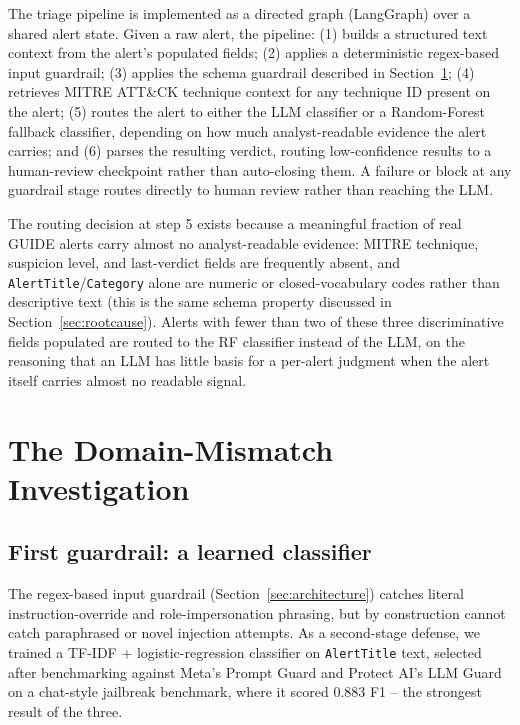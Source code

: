 \documentclass[conference]{IEEEtran}
\begin{document}
The triage pipeline is implemented as a directed graph (LangGraph) over a shared alert state.
Given a raw alert, the pipeline: (1) builds a structured text context from the alert's populated
fields; (2) applies a deterministic regex-based input guardrail; (3) applies the schema guardrail
described in Section~\ref{sec:guardrail}; (4) retrieves MITRE ATT\&CK technique context for any
technique ID present on the alert; (5) routes the alert to either the LLM classifier or a
Random-Forest fallback classifier, depending on how much analyst-readable evidence the alert
carries; and (6) parses the resulting verdict, routing low-confidence results to a human-review
checkpoint rather than auto-closing them. A failure or block at any guardrail stage routes
directly to human review rather than reaching the LLM.

The routing decision at step 5 exists because a meaningful fraction of real GUIDE alerts carry
almost no analyst-readable evidence: MITRE technique, suspicion level, and last-verdict fields
are frequently absent, and \texttt{AlertTitle}/\texttt{Category} alone are numeric or
closed-vocabulary codes rather than descriptive text (this is the same schema property discussed
in Section~\ref{sec:rootcause}). Alerts with fewer than two of these three discriminative fields
populated are routed to the RF classifier instead of the LLM, on the reasoning that an LLM has
little basis for a per-alert judgment when the alert itself carries almost no readable signal.

\section{The Domain-Mismatch Investigation}
\label{sec:guardrail}

\subsection{First guardrail: a learned classifier}

The regex-based input guardrail (Section~\ref{sec:architecture}) catches literal
instruction-override and role-impersonation phrasing, but by construction cannot catch paraphrased
or novel injection attempts. As a second-stage defense, we trained a TF-IDF + logistic-regression
classifier on \texttt{AlertTitle} text, selected after benchmarking against Meta's Prompt Guard and
Protect AI's LLM Guard on a chat-style jailbreak benchmark, where it scored 0.883 F1 -- the
strongest result of the three.
\end{document}
